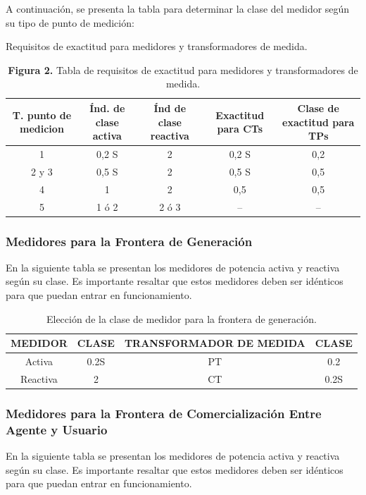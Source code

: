 A continuación, se presenta la tabla para determinar la clase del medidor según su tipo de punto de medición:

\begin{table}[t]
  \centering
  \small %
  \caption{Requisitos de exactitud para medidores y transformadores de medida.}
  \label{tab:requisitos_exactitud}
  \begin{tabular}{ccccc}
    \toprule
    \textbf{T. punto de medicion} & \textbf{Índ. de clase activa} & \textbf{Índ de clase reactiva} & \textbf{Exactitud para CTs} & \textbf{Clase de exactitud para TPs} \\
    \midrule
    1 & 0,2 S & 2 & 0,2 S & 0,2 \\
    2 y 3 & 0,5 S & 2 & 0,5 S & 0,5 \\
    4 & 1 & 2 & 0,5 & 0,5 \\
    5 & 1 ó 2 & 2 ó 3 & -- & -- \\
    \bottomrule
  \end{tabular}
  \caption*{\textbf{Figura 2.} Tabla de requisitos de exactitud para medidores y transformadores de medida.}
\end{table}

\subsubsection{Medidores para la Frontera de Generación}
En la siguiente tabla se presentan los medidores de potencia activa y reactiva según su clase. Es importante resaltar que estos medidores deben ser idénticos para que puedan entrar en funcionamiento.

\begin{table}[t]
  \centering
  \caption{Elección de la clase de medidor para la frontera de generación.}
  \label{tab:clase_medidor_generacion}
  \begin{tabular}{cccc}
    \toprule
    \textbf{MEDIDOR} & \textbf{CLASE} & \textbf{TRANSFORMADOR DE MEDIDA} & \textbf{CLASE} \\
    \midrule
    Activa & 0.2S & PT & 0.2 \\
    Reactiva & 2 & CT & 0.2S \\
    \bottomrule
  \end{tabular}
\end{table}

\subsubsection{Medidores para la Frontera de Comercialización Entre Agente y Usuario}
En la siguiente tabla se presentan los medidores de potencia activa y reactiva según su clase. Es importante resaltar que estos medidores deben ser idénticos para que puedan entrar en funcionamiento.

